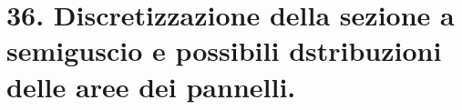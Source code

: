 \section{36. Discretizzazione della sezione a semiguscio e possibili dstribuzioni delle aree dei pannelli.}


